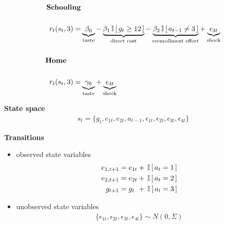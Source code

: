 \begin{frame}

\begin{align*}
\text{\textbf{Schooling}} & \\
& \\
r_t(s_t, 3) = & \underbrace{\beta_0}_{\text{taste}} - \underbrace{\beta_1 \,\mathbb{I}\,[\,g_t \geq 12\,]}_{\text{direct cost}} - \underbrace{\beta_2\,\mathbb{I}\,[\,a_{t - 1} \neq 3\,]}_{\text{reenrollment effort}} + \underbrace{\epsilon_{3t}}_{\text{shock}} \\
& \\
\text{\textbf{Home}}\qquad & \\
& \\
r_t(s_t, 3) = & \underbrace{\gamma_0}_{\text{taste}} + \underbrace{\epsilon_{4t}}_{\text{shock}}
\end{align*}
\end{frame}
\begin{frame}

\textbf{State space}\vspace{0.3cm}
\begin{align*}
	s_t = \{g_t,e_{1t},e_{2t},a_{t - 1},\epsilon_{1t},\epsilon_{2t},\epsilon_{3t},\epsilon_{4t}\}
\end{align*}

\end{frame}
\begin{frame}
  \textbf{Transitions}\vspace{0.5cm}
\begin{itemize}
\item observed state variables
\begin{align*}
    e_{1,t+1} &= e_{1t} + \,\mathbb{I}\,[\,a_t = 1\,] \\
    e_{2,t+1} &= e_{2t} + \,\mathbb{I}\,[\,a_t = 2\,] \\
    g_{t+1}   &= g_{t\phantom{2}}    +  \,\mathbb{I}\,[\,a_t = 3\,]\\
\end{align*}
\item unobserved state variables
\begin{align*}
\{\epsilon_{1t},\epsilon_{2t},\epsilon_{3t},\epsilon_{4t}\} \sim N(0, \Sigma)
\end{align*}
\end{itemize}
\end{frame}
